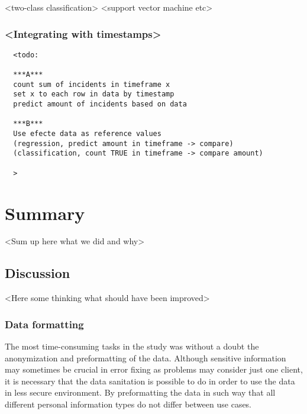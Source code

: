 \documentclass[english, 12pt, a4paper, elec, utf8, a-1b, online]{aaltothesis}
\begin{document}
<two-class classification>
<support vector machine etc>



\subsubsection*{<Integrating with timestamps>}


\begin{verbatim}
  <todo:

  ***A***
  count sum of incidents in timeframe x
  set x to each row in data by timestamp
  predict amount of incidents based on data

  ***B***
  Use efecte data as reference values
  (regression, predict amount in timeframe -> compare)
  (classification, count TRUE in timeframe -> compare amount)

  >
\end{verbatim}

\clearpage




\section{Summary}\label{sec:summary}

<Sum up here what we did and why>

\subsection{Discussion}\label{subsec:discussion}
<Here some thinking what should have been improved>

\subsubsection*{Data formatting}
The most time-consuming tasks in the study
was without a doubt
the anonymization and preformatting of the data.
Although sensitive information may sometimes be crucial in error fixing
as problems may consider just one client,
it is necessary that the data sanitation is possible to do
in order to use the data in less secure environment.
By preformatting the data in such way
that all different personal information types
do not differ between use cases.
\end{document}
